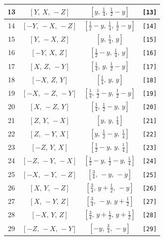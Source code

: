 \documentclass[fleqn,8pt]{jsarticle}
\begin{document}
\begin{longtable}{cccc}
13 & $\left[ Y,\, X,\, - Z \right]$ & $\left[ y,\, \frac{1}{4},\, \frac{1}{2} - y \right]$ & {\tt [13]} \\ \hline
14 & $\left[ - Y,\, - X,\, - Z \right]$ & $\left[ \frac{1}{2} - y,\, \frac{1}{4},\, \frac{1}{2} - y \right]$ & {\tt [14]} \\ \hline
15 & $\left[ Y,\, - X,\, Z \right]$ & $\left[ y,\, \frac{1}{4},\, y \right]$ & {\tt [15]} \\ \hline
16 & $\left[ - Y,\, X,\, Z \right]$ & $\left[ \frac{1}{2} - y,\, \frac{1}{4},\, y \right]$ & {\tt [16]} \\ \hline
17 & $\left[ X,\, Z,\, - Y \right]$ & $\left[ \frac{1}{4},\, y,\, \frac{1}{2} - y \right]$ & {\tt [17]} \\ \hline
18 & $\left[ - X,\, Z,\, Y \right]$ & $\left[ \frac{1}{4},\, y,\, y \right]$ & {\tt [18]} \\ \hline
19 & $\left[ - X,\, - Z,\, - Y \right]$ & $\left[ \frac{1}{4},\, \frac{1}{2} - y,\, \frac{1}{2} - y \right]$ & {\tt [19]} \\ \hline
20 & $\left[ X,\, - Z,\, Y \right]$ & $\left[ \frac{1}{4},\, \frac{1}{2} - y,\, y \right]$ & {\tt [20]} \\ \hline
21 & $\left[ Z,\, Y,\, - X \right]$ & $\left[ y,\, y,\, \frac{1}{4} \right]$ & {\tt [21]} \\ \hline
22 & $\left[ Z,\, - Y,\, X \right]$ & $\left[ y,\, \frac{1}{2} - y,\, \frac{1}{4} \right]$ & {\tt [22]} \\ \hline
23 & $\left[ - Z,\, Y,\, X \right]$ & $\left[ \frac{1}{2} - y,\, y,\, \frac{1}{4} \right]$ & {\tt [23]} \\ \hline
24 & $\left[ - Z,\, - Y,\, - X \right]$ & $\left[ \frac{1}{2} - y,\, \frac{1}{2} - y,\, \frac{1}{4} \right]$ & {\tt [24]} \\ \hline
25 & $\left[ - X,\, - Y,\, - Z \right]$ & $\left[ \frac{3}{4},\, - y,\, - y \right]$ & {\tt [25]} \\ \hline
26 & $\left[ X,\, Y,\, - Z \right]$ & $\left[ \frac{3}{4},\, y + \frac{1}{2},\, - y \right]$ & {\tt [26]} \\ \hline
27 & $\left[ X,\, - Y,\, Z \right]$ & $\left[ \frac{3}{4},\, - y,\, y + \frac{1}{2} \right]$ & {\tt [27]} \\ \hline
28 & $\left[ - X,\, Y,\, Z \right]$ & $\left[ \frac{3}{4},\, y + \frac{1}{2},\, y + \frac{1}{2} \right]$ & {\tt [28]} \\ \hline
29 & $\left[ - Z,\, - X,\, - Y \right]$ & $\left[ - y,\, \frac{3}{4},\, - y \right]$ & {\tt [29]} \\ \hline

\end{longtable}
\end{document}
